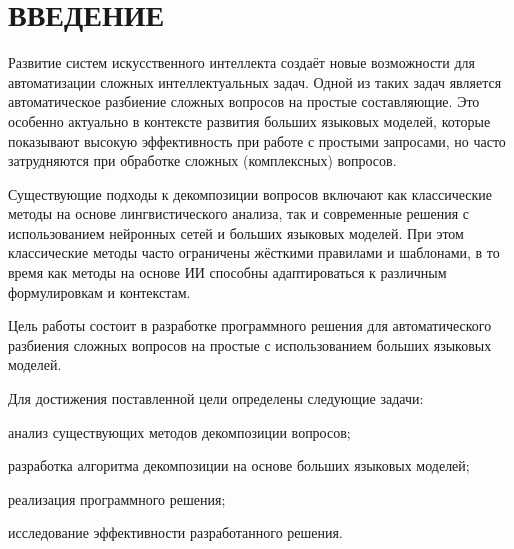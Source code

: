 \part*{ВВЕДЕНИЕ}

Развитие систем искусственного интеллекта создаёт новые возможности для автоматизации сложных интеллектуальных задач. Одной из таких задач является автоматическое разбиение сложных вопросов на простые составляющие. Это особенно актуально в контексте развития больших языковых моделей, которые показывают высокую эффективность при работе с простыми запросами, но часто затрудняются при обработке сложных (комплексных) вопросов. \cite{press2023measuring}

Существующие подходы к декомпозиции вопросов включают как классические методы на основе лингвистического анализа, так и современные решения с использованием нейронных сетей и больших языковых моделей. При этом классические методы часто ограничены жёсткими правилами и шаблонами, в то время как методы на основе ИИ способны адаптироваться к различным формулировкам и контекстам.

Цель работы состоит в разработке программного решения для автоматического разбиения сложных вопросов на простые с использованием больших языковых моделей.

Для достижения поставленной цели определены следующие задачи:

\begin{enumdescript}
	\item анализ существующих методов декомпозиции вопросов;
	\item разработка алгоритма декомпозиции на основе больших языковых моделей;
	\item реализация программного решения;
	\item исследование эффективности разработанного решения.
\end{enumdescript}